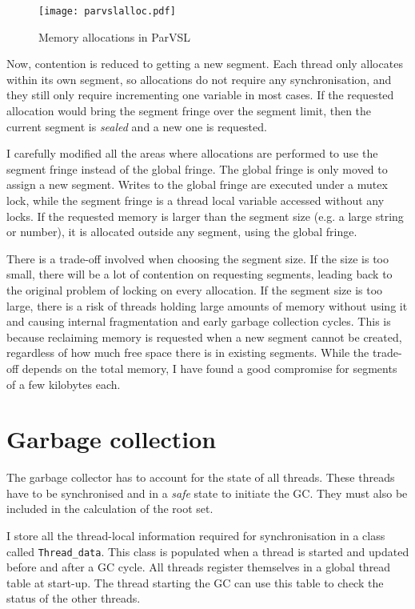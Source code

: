 \begin{figure}[H]
  \centering
  \texttt{[image: parvslalloc.pdf]}
  \caption{Memory allocations in ParVSL}
  \label{fig:parvslalloc}
\end{figure}

Now, contention is reduced to getting a new segment. Each thread only allocates within
its own segment, so allocations do not require any synchronisation, and they still only
require incrementing one variable in most cases. If the requested allocation would bring
the segment fringe over the segment limit, then the current segment is \emph{sealed} and a new one is
requested.

I carefully modified all the areas where allocations are performed to use the segment fringe
instead of the global fringe. The global fringe is only moved to assign a new segment. Writes
to the global fringe are executed under a mutex lock, while the segment fringe is a thread local
variable accessed without any locks. If the requested memory is larger than the segment size
(e.g. a large string or number), it is allocated outside any segment, using the global fringe.

There is a trade-off involved when choosing the segment size. If the size is too small,
there will be a lot of contention on requesting segments, leading back to the original
problem of locking on every allocation. If the segment size is too large, there is a risk
of threads holding large amounts of memory without using it and causing internal fragmentation and
early garbage collection cycles. This is because reclaiming memory is requested when a new segment cannot be created,
regardless of how much free space there is in existing segments. While the trade-off depends on the
total memory, I have found a good compromise for segments of a few kilobytes each.

\section{Garbage collection}
\label{sec:gc}
The garbage collector has to account for the state of all threads. These threads have to be synchronised
and in a \emph{safe} state to initiate the GC. They must also be included in the calculation of the root set.

I store all the thread-local information required for synchronisation in a class called \verb|Thread_data|. This
class is populated when a thread is started and updated before and after a GC cycle. All threads register
themselves in a global thread table at start-up. The thread starting the GC can use this table to check the status
of the other threads.

